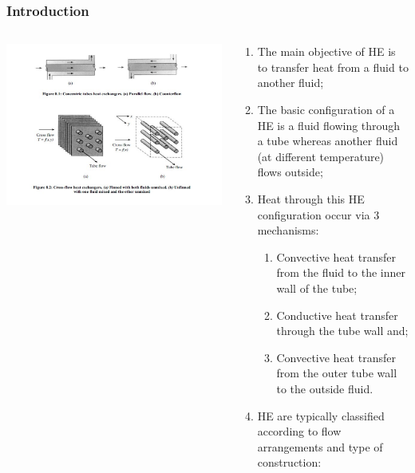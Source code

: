 \documentclass[10pt,compress,unknownkeysallowed]{beamer}
\begin{document}
\begin{frame}
  \frametitle{Introduction}
    \begin{columns}
       \begin{column}[l]{0.5\linewidth}
         \includegraphics[width=1.3\columnwidth,clip]{./Pics/HeatExchangers_Classification}
       \end{column}
       \begin{column}[l]{0.5\linewidth}
         \begin{enumerate}\scriptsize
            \item<1-> The main objective of HE is to transfer heat from a fluid to another fluid;
            \item<1-> The basic configuration of a HE is a fluid flowing through a tube whereas another fluid (at different temperature) flows outside;
            \item<2-> Heat through this HE configuration occur via 3 mechanisms:
              \begin{enumerate}\scriptsize
                 \item<2-> Convective heat transfer from the fluid to the inner wall of the tube;
                 \item<2-> Conductive heat transfer through the tube wall and;
                 \item<2-> Convective heat transfer from the outer tube wall to the outside fluid.
              \end{enumerate}
            \item<3-> HE are typically classified according to flow arrangements and type of construction:

\end{enumerate}
\end{column}
\end{columns}
\end{frame}
\end{document}
